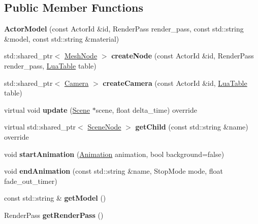 \subsection*{Public Member Functions}
\begin{DoxyCompactItemize}
\item 
\mbox{\label{classTarbora_1_1ActorModel_a1fefe619a840e2bbdf214e5d44962193}} 
{\bfseries Actor\+Model} (const Actor\+Id \&id, Render\+Pass render\+\_\+pass, const std\+::string \&model, const std\+::string \&material)
\item 
\mbox{\label{classTarbora_1_1ActorModel_a444103ab29247d23375fe2a55392fae0}} 
std\+::shared\+\_\+ptr$<$ \hyperlink{classTarbora_1_1MeshNode}{Mesh\+Node} $>$ {\bfseries create\+Node} (const Actor\+Id \&id, Render\+Pass render\+\_\+pass, \hyperlink{classTarbora_1_1LuaTable}{Lua\+Table} table)
\item 
\mbox{\label{classTarbora_1_1ActorModel_a162b40dc0f465add232c332fd7899610}} 
std\+::shared\+\_\+ptr$<$ \hyperlink{classTarbora_1_1Camera}{Camera} $>$ {\bfseries create\+Camera} (const Actor\+Id \&id, \hyperlink{classTarbora_1_1LuaTable}{Lua\+Table} table)
\item 
\mbox{\label{classTarbora_1_1ActorModel_a7c6a17305abb923b03a190e90b4f856e}} 
virtual void {\bfseries update} (\hyperlink{classTarbora_1_1Scene}{Scene} $\ast$scene, float delta\+\_\+time) override
\item 
\mbox{\label{classTarbora_1_1ActorModel_a896fc0026eeed7a5527846711364cd88}} 
virtual std\+::shared\+\_\+ptr$<$ \hyperlink{classTarbora_1_1SceneNode}{Scene\+Node} $>$ {\bfseries get\+Child} (const std\+::string \&name) override
\item 
\mbox{\label{classTarbora_1_1ActorModel_aadffd78db0a996cb2accb2f2476f0571}} 
void {\bfseries start\+Animation} (\hyperlink{structTarbora_1_1Animation}{Animation} animation, bool background=false)
\item 
\mbox{\label{classTarbora_1_1ActorModel_a7f55aa586b116b6cf62cc8723062282f}} 
void {\bfseries end\+Animation} (const std\+::string \&name, Stop\+Mode mode, float fade\+\_\+out\+\_\+timer)
\item 
\mbox{\label{classTarbora_1_1ActorModel_a9c2a219815c5952de9aa1b4cd298b23d}} 
const std\+::string \& {\bfseries get\+Model} ()
\item 
\mbox{\label{classTarbora_1_1ActorModel_a2955e28f4e1ab4fcb81affcbcd04cbd5}} 
Render\+Pass {\bfseries get\+Render\+Pass} ()
\end{DoxyCompactItemize}
